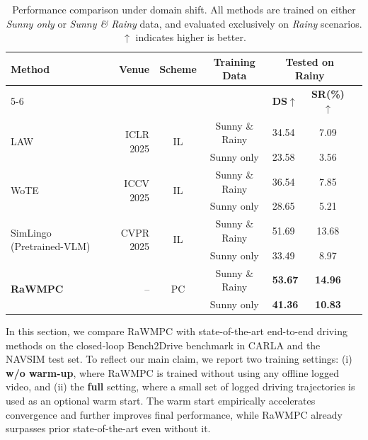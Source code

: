 \documentclass[twocolumn]{template}
\theoremstyle{thmstyleone}%
\theoremstyle{thmstyletwo}%
\theoremstyle{thmstylethree}%
\begin{document}
\begin{table}[t]
    \centering
    \setlength{\tabcolsep}{5.0pt}
    \caption{Performance comparison under domain shift.
    All methods are trained on either \textit{Sunny only} or \textit{Sunny \& Rainy} data, and evaluated exclusively on \textit{Rainy} scenarios.
    $\uparrow$ indicates higher is better.}
    \begin{tabular}{lrcclcc}
        \toprule
        \multirow{2.5}{*}{\textbf{Method}} 
        & \multirow{2.5}{*}{\textbf{Venue}} 
        & \multirow{2.5}{*}{\textbf{Scheme}} 
        & \multirow{2.5}{*}{\textbf{Training Data}} 
        & \multicolumn{2}{c}{\textbf{Tested on Rainy}} \\
        \cmidrule(lr){5-6}
        & & & & \textbf{DS$\uparrow$} & \textbf{SR(\%)$\uparrow$} \\
        \midrule
        \multirow{2}{*}{LAW} 
        & \multirow{2}{*}{ICLR 2025} 
        & \multirow{2}{*}{IL} 
        & Sunny \& Rainy 
        & 34.54 & 7.09 \\
        & & & Sunny only 
        & 23.58 & 3.56 \\
        \midrule
        \multirow{2}{*}{WoTE} 
        & \multirow{2}{*}{ICCV 2025} 
        & \multirow{2}{*}{IL} 
        & Sunny \& Rainy 
        & 36.54 & 7.85 \\
        & & & Sunny only 
        & 28.65 & 5.21 \\
        \midrule
        \multirow{2}{*}{SimLingo (Pretrained-VLM)} 
        & \multirow{2}{*}{CVPR 2025} 
        & \multirow{2}{*}{IL} 
        & Sunny \& Rainy 
        & 51.69 & 13.68 \\
        & & & Sunny only 
        & 33.49 & 8.97 \\
        \midrule
        \multirow{2}{*}{\textbf{RaWMPC}} 
        & \multirow{2}{*}{--} 
        & \multirow{2}{*}{PC} 
        & Sunny \& Rainy 
        & \textbf{53.67} & \textbf{14.96} \\
        & & & Sunny only 
        & \textbf{41.36} & \textbf{10.83} \\
        \bottomrule
    \end{tabular}
    \label{tab:domain_shift_rainy}
\end{table}

In this section,
we compare RaWMPC with state-of-the-art end-to-end driving methods on the closed-loop Bench2Drive benchmark in CARLA and the NAVSIM test set.
To reflect our main claim, we report two training settings:
(i) \textbf{w/o warm-up}, where RaWMPC is trained without using any offline logged video,
and (ii) the \textbf{full} setting,
where a small set of logged driving trajectories is used as an optional warm start.
The warm start empirically accelerates convergence and further improves final performance, while RaWMPC already surpasses prior state-of-the-art even without it.
\end{document}
